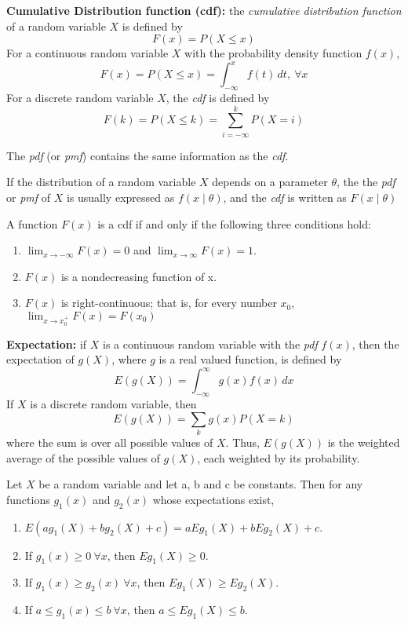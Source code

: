 \begin{definition}
	\textbf{Cumulative Distribution function (cdf):} the \textit{cumulative distribution function} of a random variable $X$ is defined by
	\[
		F(x) = P(X \leq x)
	\]
	For a continuous random variable $X$ with the probability density function $f(x)$,
	\[
	F(x) = P(X \leq x) = \int_{-\infty}^x f(t)\,dt, \ \forall x
	\]
	For a discrete random variable $X$, the \textit{cdf} is defined by
	\[
	F(k) = P(X \leq k) = \sum_{i = -\infty}^k P(X = i)
	\]
\end{definition}
The \textit{pdf} (or \textit{pmf}) contains the same information as the \textit{cdf}.

If the distribution of a random variable $X$ depends on a parameter $\theta$, the the \textit{pdf} or \textit{pmf} of $X$ is usually expressed as $f(x \mid \theta)$, and the \textit{cdf} is written as $F(x \mid \theta)$
\begin{theorem}
	A function $F(x)$ is a cdf if and only if the following three conditions hold:
	\begin{enumerate}[\bfseries a)]
		\item $\lim_{x \rightarrow -\infty}F(x) = 0$ and $\lim_{x \rightarrow \infty}F(x) = 1$.
		\item $F(x)$ is a nondecreasing function of x.
		\item $F(x)$ is right-continuous; that is, for every number $x_0$, $\lim_{x \rightarrow x_0^{+}} F(x) = F(x_0)$
	\end{enumerate}
\end{theorem}

\begin{definition}
	\textbf{Expectation:} if $X$ is a continuous random variable with the \textit{pdf} $f(x)$, then the expectation of $g(X)$, where $g$ is a real valued function, is defined by
	\[
		E(g(X)) = \int_{-\infty}^{\infty}g(x)f(x)\,dx
	\]
	If $X$ is a discrete random variable, then
	\[
		E(g(X)) = \sum_k g(x) P(X = k)
	\]
	where the sum is over all possible values of $X$. Thus, $E(g(X))$ is the weighted average of the possible values of $g(X)$, each weighted by its probability.
\end{definition}

\begin{theorem}
	Let $X$ be a random variable and let a, b and c be constants. Then for any functions $g_1(x)$ and $g_2(x)$ whose expectations exist,
	\begin{enumerate}[\bfseries a)]
		\item $E(ag_1(X) + bg_2(X) + c) = aEg_1(X) + bEg_2(X) + c$.
		\item If $g_1(x) \geq 0 \ \forall x$, then $Eg_1(X) \geq 0$.
		\item If $g_1(x) \geq g_2(x) \ \forall x$, then $Eg_1(X) \geq Eg_2(X)$.
		\item If $a \leq g_1(x) \leq b \ \forall x$, then $a \leq Eg_1(X) \leq b$. 
	\end{enumerate}
\end{theorem}

